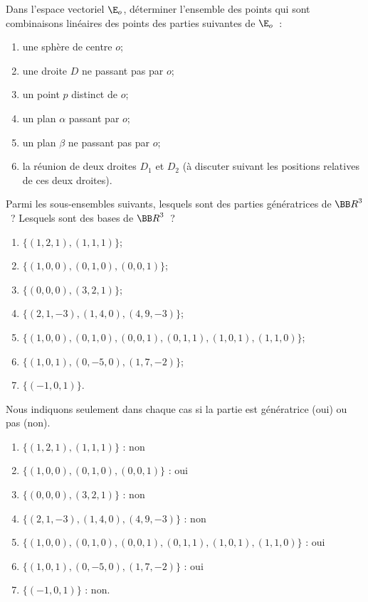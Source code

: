 \documentclass[12pt,french,oneside,a4paper]{memoir} %
\begin{document}
\begin{exo}
Dans l'espace vectoriel ${\E}_o$, déterminer l'ensemble des points 
qui sont combinaisons linéaires des points des parties suivantes de 
${\E}_o$~:
\begin{enumerate} 
\item une sphère de centre $o$; 
\item une droite $D$ ne passant pas par $o$; 
\item un point $p$ distinct de $o$; 
\item un plan $\alpha$ passant par $o$; 
\item un plan $\beta$ ne passant pas par $o$; 
\item la réunion de deux droites $D_1$ et $D_2$ (à discuter suivant les 
positions relatives de ces deux droites). 
\end{enumerate}
\end{exo}
\begin{exo} %
Parmi les sous-ensembles suivants, lesquels sont des parties génératrices 
de ${\BB R}^3$~? Lesquels sont des bases de ${\BB R}^3$~? 
\begin{enumerate}
\item $\{(1,2,1),(1,1,1) \}$;
\item $\{(1,0,0),(0,1,0),(0,0,1) \}$; 
\item $\{(0,0,0),(3,2,1) \}$; 
\item $\{(2,1,-3),(1,4,0),(4,9,-3) \}$;
\item $\{(1,0,0),(0,1,0),(0,0,1),(0,1,1),(1,0,1),(1,1,0) \}$; 
\item $\{(1,0,1),(0,-5,0),(1,7,-2) \}$;
\item $\{(-1,0,1) \}$.
\end{enumerate}
\begin{correction}
Nous indiquons seulement dans chaque cas si la partie est génératrice (\og oui\fg{}) ou pas (\og non\fg{}).
\begin{enumerate}
\item $\{(1,2,1),(1,1,1) \}$ : non
\item $\{(1,0,0),(0,1,0),(0,0,1) \}$ : oui
\item $\{(0,0,0),(3,2,1) \}$ : non
\item $\{(2,1,-3),(1,4,0),(4,9,-3) \}$ : non
\item $\{(1,0,0),(0,1,0),(0,0,1),(0,1,1),(1,0,1),(1,1,0) \}$ : oui
\item $\{(1,0,1),(0,-5,0),(1,7,-2) \}$ : oui
\item $\{(-1,0,1) \}$ : non.
\end{enumerate}
\end{correction}
\end{exo}
\end{document}
